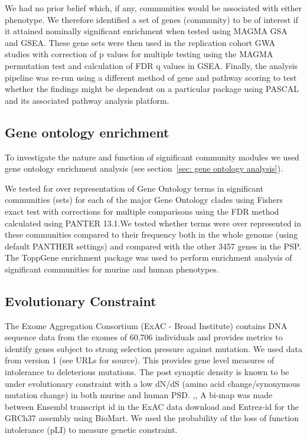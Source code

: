We had no prior belief which, if any, communities would be associated with either phenotype. We therefore identified a set of genes (community) to be of interest if it attained nominally significant enrichment when tested using MAGMA GSA and GSEA. These gene sets were then used in the replication cohort GWA studies with correction of p values for multiple testing using the MAGMA permutation test and calculation of FDR q values in GSEA. Finally, the analysis pipeline was re-run using a different method of gene
and pathway scoring to test whether the findings might be dependent on a particular package using PASCAL and its associated pathway analysis platform. \cite{lamparter2016fast}  

\subsection{Gene ontology enrichment}
To investigate the nature and function of significant community modules we used gene ontology enrichment analysis (see section~\ref{sec: gene ontology analysis}). \cite{mi2013large}  

 We tested for over representation of Gene Ontology terms in significant communities (sets) for each of the major Gene Ontology clades using Fishers exact test with corrections for multiple comparisons using the FDR method calculated using PANTER 13.1.\cite{mi2013large}We tested whether terms were over represented in these communities compared to their frequency both in the whole genome (using default  PANTHER settings) and compared with the  other 3457 genes in the PSP. \cite{mi2013large}  The ToppGene enrichment package was used to perform enrichment analysis of significant communities for murine and human phenotypes. \cite{chen2009toppgene}  

\subsection{Evolutionary Constraint}

The Exome Aggregation Consortium (ExAC - Broad Institute) contains DNA sequence data from the exomes of 60,706 individuals and provides metrics to identify genes subject to strong selection pressure against mutation. \cite{lek2016analysis}  We used data from version 1 (see URLs for source). This provides gene level measures of intolerance to deleterious mutations. The post synaptic density is known to be under evolutionary constraint with a low dN/dS (amino acid change/synonymous mutation change) in both murine and human PSD. \cite{ryan2009origin},\cite{bayes2012comparative},\cite{bayes2011characterization}  A bi-map was made between Ensembl transcript id in the ExAC data download and Entrez-id for the GRCh37 assembly using BioMart. \cite{smedley2015biomart}  We used the probability of the loss of function intolerance (pLI) to measure genetic constraint.

